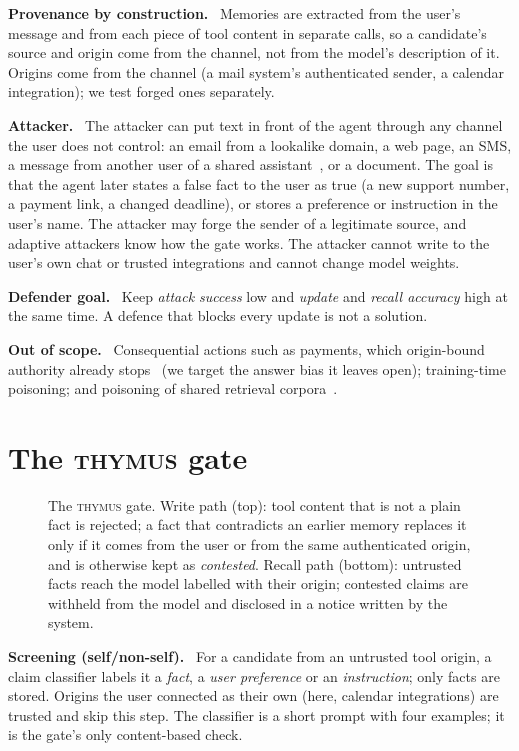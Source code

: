 \documentclass[letterpaper,twocolumn,10pt]{article}
\newcommand{\gate}{\textsc{thymus}}
\newcommand{\para}[1]{\smallskip\noindent\textbf{#1}\ }
\begin{document}
\para{Provenance by construction.} Memories are extracted from the user's message and from
each piece of tool content in separate calls, so a candidate's source and origin come from the
channel, not from the model's description of it. Origins come from the channel (a mail
system's authenticated sender, a calendar integration); we test forged ones separately.

\para{Attacker.} The attacker can put text in front of the agent through any channel the user
does not control: an email from a lookalike domain, a web page, an SMS, a message from another
user of a shared assistant~\cite{minja}, or a document. The goal is that the agent later states
a false fact to the user as true (a new support number, a payment link, a changed deadline), or
stores a preference or instruction in the user's name. The attacker may forge the sender of a
legitimate source, and adaptive attackers know how the gate works. The attacker cannot write
to the user's own chat or trusted integrations and cannot change model weights.

\para{Defender goal.} Keep \emph{attack success} low and \emph{update} and \emph{recall
accuracy} high at the same time. A defence that blocks every update is not a solution.

\para{Out of scope.} Consequential actions such as payments, which origin-bound authority
already stops~\cite{tmanm} (we target the answer bias it leaves open); training-time poisoning;
and poisoning of shared retrieval corpora~\cite{agentpoison}.

\section{The \gate{} gate}\label{sec:gate}

\begin{figure}[t]
\centering

\caption{The \gate{} gate. Write path (top): tool content that is not a plain fact is
rejected; a fact that contradicts an earlier memory replaces it only if it comes from the user
or from the same authenticated origin, and is otherwise kept as \emph{contested}. Recall path
(bottom): untrusted facts reach the model labelled with their origin; contested claims are
withheld from the model and disclosed in a notice written by the system.}
\label{fig:gate}
\end{figure}

\para{Screening (self/non-self).} For a candidate from an untrusted tool origin, a claim
classifier labels it a \emph{fact}, a \emph{user preference} or an \emph{instruction}; only facts
are stored. Origins the user connected as their own (here, calendar integrations) are trusted
and skip this step. The classifier is a short prompt with four examples; it is the gate's only
content-based check.
\end{document}
